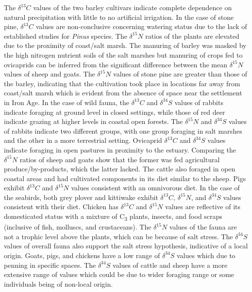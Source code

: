 \documentclass[preprint, 3p, authoryear]{elsarticle} %
\begin{document}
The \(\delta ^{13}C\) values of the two barley cultivars indicate complete dependence on natural precipitation with little to no artificial irrigation. In the case of stone pine, \(\delta ^{13}C\) values are non-conclusive concerning watering status due to the lack of established studies for \emph{Pinus} species. The \(\delta ^{15}N\) ratios of the plants are elevated due to the proximity of coast/salt marsh. The manuring of barley was masked by the high nitrogen nutrient soils of the salt marshes but manuring of crops fed to ovicaprids can be inferred from the significant difference between the mean \(\delta ^{15}N\) values of sheep and goats. The \(\delta ^{15}N\) values of stone pine are greater than those of the barley, indicating that the cultivation took place in locations far away from coast/salt marsh which is evident from the absence of space near the settlement in Iron Age. In the case of wild fauna, the \(\delta ^{13}C\) and \(\delta ^{34}S\) values of rabbits indicate foraging at ground level in closed settings, while those of red deer indicate grazing at higher levels in coastal open forests. The \(\delta ^{15}N\) and \(\delta ^{34}S\) values of rabbits indicate two different groups, with one group foraging in salt marshes and the other in a more terrestrial setting. Ovicaprid \(\delta ^{13}C\) and \(\delta ^{34}S\) values indicate foraging in open pastures in proximity to the estuary. Comparing the \(\delta ^{15}N\) ratios of sheep and goats show that the former was fed agricultural produce/by-products, which the latter lacked. The cattle also foraged in open coastal areas and had cultivated components in its diet similar to the sheep. Pigs exhibit \(\delta ^{13}C\) and \(\delta ^{15}N\) values consistent with an omnivorous diet. In the case of the seabirds, both grey plover and kittiwake exhibit \(\delta ^{13}C\), \(\delta ^{15}N\), and \(\delta ^{34}S\) values consistent with their diet. Chicken has \(\delta ^{13}C\) and \(\delta ^{15}N\) values are reflective of its domesticated status with a mixture of C\textsubscript{3} plants, insects, and food scraps (inclusive of fish, molluscs, and crustaceans). The \(\delta ^{15}N\) values of the fauna are not a trophic level above the plants, which can be because of salt stress. The \(\delta ^{34}S\) values of overall fauna also support the salt stress hypothesis, indicative of a local origin. Goats, pigs, and chickens have a low range of \(\delta ^{34}S\) values which due to penning in specific spaces. The \(\delta ^{34}S\) values of cattle and sheep have a more extensive range of values which could be due to wider foraging range or some individuals being of non-local origin.
\end{document}
